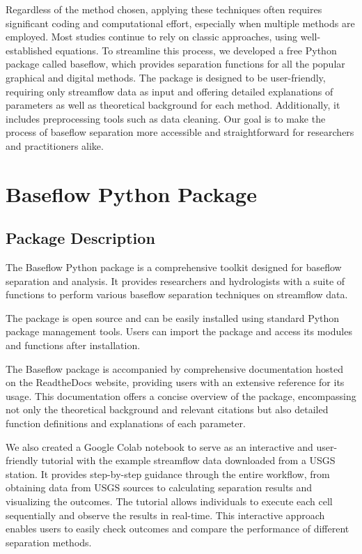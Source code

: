\documentclass[hydrology,article,submit,pdftex,moreauthors]{Definitions/mdpi}
\begin{document}
Regardless of the method chosen, applying these techniques often requires significant coding and computational effort, especially when multiple methods are employed. Most studies continue to rely on classic approaches, using well-established equations. To streamline this process, we developed a free Python package called baseflow, which provides separation functions for all the popular graphical and digital methods. The package is designed to be user-friendly, requiring only streamflow data as input and offering detailed explanations of parameters as well as theoretical background for each method. Additionally, it includes preprocessing tools such as data cleaning. Our goal is to make the process of baseflow separation more accessible and straightforward for researchers and practitioners alike.

\section{Baseflow Python Package}
\label{sec:package}

\subsection{Package Description}
\label{sec:package_description}

The Baseflow Python package is a comprehensive toolkit designed for baseflow separation and analysis. It provides researchers and hydrologists with a suite of functions to perform various baseflow separation techniques on streamflow data.

The package is open source and can be easily installed using standard Python package management tools. Users can import the package and access its modules and functions after installation.

The Baseflow package is accompanied by comprehensive documentation hosted on the ReadtheDocs website, providing users with an extensive reference for its usage. This documentation offers a concise overview of the package, encompassing not only the theoretical background and relevant citations but also detailed function definitions and explanations of each parameter.

We also created a Google Colab notebook to serve as an interactive and user-friendly tutorial with the example streamflow data downloaded from a USGS station. It provides step-by-step guidance through the entire workflow, from obtaining data from USGS sources to calculating separation results and visualizing the outcomes. The tutorial allows individuals to execute each cell sequentially and observe the results in real-time. This interactive approach enables users to easily check outcomes and compare the performance of different separation methods.
\end{document}
